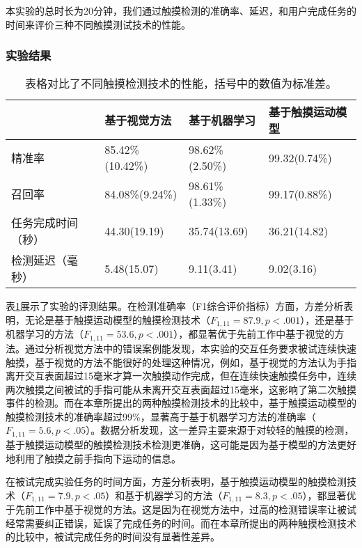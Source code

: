 本实验的总时长为20分钟，我们通过触摸检测的准确率、延迟，和用户完成任务的时间来评价三种不同触摸测试技术的性能。

\subsubsection{实验结果}

\begin{table}[!htbp]
	\centering
	\begin{tabular}{l|lll}
		\toprule
		& 基于视觉方法\cite{xiao2018mrtouch}  & 基于机器学习 & 基于触摸运动模型 \\
		\midrule
		精准率 & 85.42\%(10.42\%) & 98.62\%(2.50\%) & 99.32(0.74\%) \\
		召回率 & 84.08\%(9.24\%) & 98.61\%(1.33\%)  & 99.17(0.88\%) \\
		任务完成时间（秒） & 44.30(19.19) & 35.74(13.69) & 36.21(14.82) \\
		检测延迟（毫秒） & 5.48(15.07) & 9.11(3.41) & 9.02(3.16) \\
		\bottomrule
	\end{tabular}
	\caption{表格对比了不同触摸检测技术的性能，括号中的数值为标准差。}
	\label{tab:tapping_ring_study3}
\end{table}


表\ref{tab:tapping_ring_study3}展示了实验的评测结果。在检测准确率（F1综合评价指标）方面，方差分析表明，无论是基于触摸运动模型的触摸检测技术（$F_{1,11}=87.9,p<.001$），还是基于机器学习的方法（$F_{1,11}=53.6,p<.001$），都显著优于先前工作中基于视觉的方法。通过分析视觉方法中的错误案例能发现，本实验的交互任务要求被试连续快速触摸，基于视觉的方法不能很好的处理这种情况，例如，基于视觉的方法认为手指离开交互表面超过15毫米才算一次触摸动作完成，但在连续快速触摸任务中，连续两次触摸之间被试的手指可能从未离开交互表面超过15毫米，这影响了第二次触摸事件的检测。而在本章所提出的两种触摸检测技术的比较中，基于触摸运动模型的触摸检测技术的准确率超过99\%，显著高于基于机器学习方法的准确率（$F_{1,11}=5.6,p<.05$）。数据分析发现，这一差异主要来源于对较轻的触摸的检测，基于触摸运动模型的触摸检测技术检测更准确，这可能是因为基于模型的方法更好地利用了触摸之前手指向下运动的信息。

在被试完成实验任务的时间方面，方差分析表明，基于触摸运动模型的触摸检测技术（$F_{1,11}=7.9,p<.05$）和基于机器学习的方法（$F_{1,11}=8.3,p<.05$），都显著优于先前工作中基于视觉的方法。这是因为在视觉方法中，过高的检测错误率让被试经常需要纠正错误，延误了完成任务的时间。而在本章所提出的两种触摸检测技术的比较中，被试完成任务的时间没有显著性差异。

